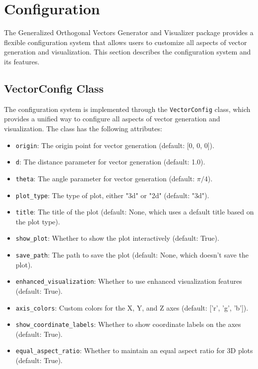 \newpage
\section{Configuration}

The Generalized Orthogonal Vectors Generator and Visualizer package provides a flexible configuration system that allows users to customize all aspects of vector generation and visualization. This section describes the configuration system and its features.

\subsection{VectorConfig Class}

The configuration system is implemented through the \texttt{VectorConfig} class, which provides a unified way to configure all aspects of vector generation and visualization. The class has the following attributes:

\begin{itemize}
    \item \texttt{origin}: The origin point for vector generation (default: [0, 0, 0]).
    \item \texttt{d}: The distance parameter for vector generation (default: 1.0).
    \item \texttt{theta}: The angle parameter for vector generation (default: $\pi/4$).
    \item \texttt{plot\_type}: The type of plot, either "3d" or "2d" (default: "3d").
    \item \texttt{title}: The title of the plot (default: None, which uses a default title based on the plot type).
    \item \texttt{show\_plot}: Whether to show the plot interactively (default: True).
    \item \texttt{save\_path}: The path to save the plot (default: None, which doesn't save the plot).
    \item \texttt{enhanced\_visualization}: Whether to use enhanced visualization features (default: True).
    \item \texttt{axis\_colors}: Custom colors for the X, Y, and Z axes (default: ['r', 'g', 'b']).
    \item \texttt{show\_coordinate\_labels}: Whether to show coordinate labels on the axes (default: True).
    \item \texttt{equal\_aspect\_ratio}: Whether to maintain an equal aspect ratio for 3D plots (default: True).
\end{itemize}

